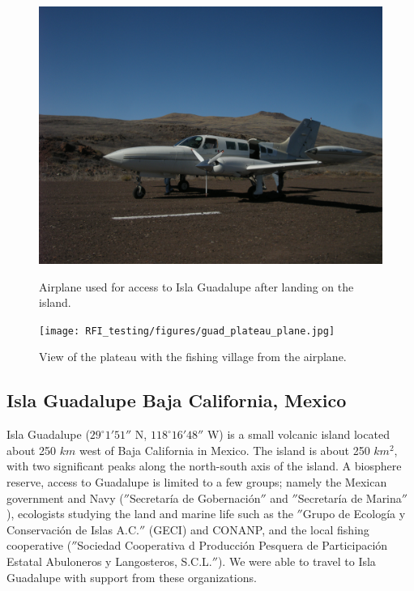 \begin{figure}[tb]
\centering
\begin{minipage}[b]{0.47\textwidth}
\centering
\includegraphics[width=0.95\linewidth]{RFI_testing/figures/guad_plane.jpg}
\caption{Airplane used for access to Isla Guadalupe after landing on the island.}
\label{Fig:guadplane}
\end{minipage}%
\begin{minipage}[b]{0.02\textwidth}
\hspace{1cm}
\end{minipage}%
\begin{minipage}[b]{0.47\textwidth}
\centering
\texttt{[image: RFI\_testing/figures/guad\_plateau\_plane.jpg]}
\caption{View of the plateau with the fishing village from the airplane.}
\label{Fig:guadplateau}
\end{minipage}
\end{figure}

\subsection{Isla Guadalupe Baja California, Mexico}

Isla Guadalupe ($29^\circ 1' 51''$ N, $118^\circ 16' 48''$ W) is a small volcanic island located about 250 $km$ west of Baja California in Mexico. The island is about 250 $km^2$, with two significant peaks along the north-south axis of the island. A biosphere reserve, access to Guadalupe is limited to a few groups; namely the Mexican government and Navy ($''$Secretar\'{i}a de Gobernaci\'{o}n$''$ and $''$Secretar\'{i}a de Marina$''$), ecologists studying the land and marine life such as the $''$Grupo de Ecolog\'{i}a y Conservaci\'{o}n de Islas A.C.$''$ (GECI) and CONANP, and the local fishing cooperative ($''$Sociedad Cooperativa d Producci\'{o}n Pesquera de Participaci\'{o}n Estatal Abuloneros y Langosteros, S.C.L.$''$). We were able to travel to Isla Guadalupe with support from these organizations. 

